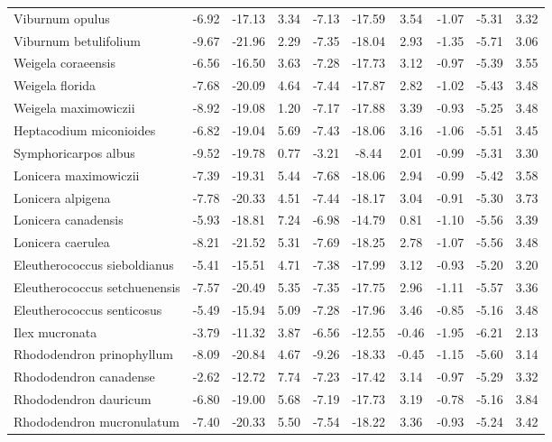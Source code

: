 \documentclass[11pt]{article}
\begin{document}
\begin{longtable}{p{1.50in}c{0.32in}c{0.32in}c{0.32in}c{0.32in}c{0.32in}c{0.32in}c{0.2in}c{0.3in}c{0.1in}}
  Viburnum opulus & -6.92 & -17.13 & 3.34 & -7.13 & -17.59 & 3.54 & -1.07 & -5.31 & 3.32 \\ 
  Viburnum betulifolium & -9.67 & -21.96 & 2.29 & -7.35 & -18.04 & 2.93 & -1.35 & -5.71 & 3.06 \\ 
  Weigela coraeensis & -6.56 & -16.50 & 3.63 & -7.28 & -17.73 & 3.12 & -0.97 & -5.39 & 3.55 \\ 
  Weigela florida & -7.68 & -20.09 & 4.64 & -7.44 & -17.87 & 2.82 & -1.02 & -5.43 & 3.48 \\ 
  Weigela maximowiczii & -8.92 & -19.08 & 1.20 & -7.17 & -17.88 & 3.39 & -0.93 & -5.25 & 3.48 \\ 
  Heptacodium miconioides & -6.82 & -19.04 & 5.69 & -7.43 & -18.06 & 3.16 & -1.06 & -5.51 & 3.45 \\ 
  Symphoricarpos albus & -9.52 & -19.78 & 0.77 & -3.21 & -8.44 & 2.01 & -0.99 & -5.31 & 3.30 \\ 
  Lonicera maximowiczii & -7.39 & -19.31 & 5.44 & -7.68 & -18.06 & 2.94 & -0.99 & -5.42 & 3.58 \\ 
  Lonicera alpigena & -7.78 & -20.33 & 4.51 & -7.44 & -18.17 & 3.04 & -0.91 & -5.30 & 3.73 \\ 
  Lonicera canadensis & -5.93 & -18.81 & 7.24 & -6.98 & -14.79 & 0.81 & -1.10 & -5.56 & 3.39 \\ 
  Lonicera caerulea & -8.21 & -21.52 & 5.31 & -7.69 & -18.25 & 2.78 & -1.07 & -5.56 & 3.48 \\ 
  Eleutherococcus sieboldianus & -5.41 & -15.51 & 4.71 & -7.38 & -17.99 & 3.12 & -0.93 & -5.20 & 3.20 \\ 
  Eleutherococcus setchuenensis & -7.57 & -20.49 & 5.35 & -7.35 & -17.75 & 2.96 & -1.11 & -5.57 & 3.36 \\ 
  Eleutherococcus senticosus & -5.49 & -15.94 & 5.09 & -7.28 & -17.96 & 3.46 & -0.85 & -5.16 & 3.48 \\ 
  Ilex mucronata & -3.79 & -11.32 & 3.87 & -6.56 & -12.55 & -0.46 & -1.95 & -6.21 & 2.13 \\ 
  Rhododendron prinophyllum & -8.09 & -20.84 & 4.67 & -9.26 & -18.33 & -0.45 & -1.15 & -5.60 & 3.14 \\ 
  Rhododendron canadense & -2.62 & -12.72 & 7.74 & -7.23 & -17.42 & 3.14 & -0.97 & -5.29 & 3.32 \\ 
  Rhododendron dauricum & -6.80 & -19.00 & 5.68 & -7.19 & -17.73 & 3.19 & -0.78 & -5.16 & 3.84 \\ 
  Rhododendron mucronulatum & -7.40 & -20.33 & 5.50 & -7.54 & -18.22 & 3.36 & -0.93 & -5.24 & 3.42 \\ 

\end{longtable}
\end{document}
